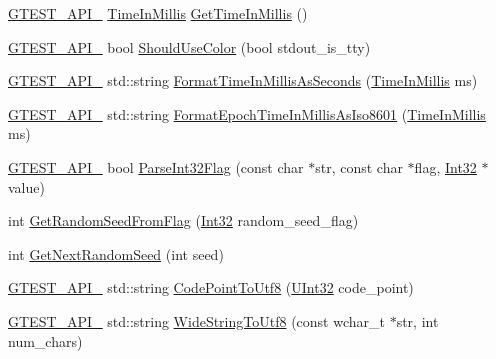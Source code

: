 \begin{DoxyCompactItemize}
\item 
\hyperlink{gtest-port_8h_aa73be6f0ba4a7456180a94904ce17790}{G\+T\+E\+S\+T\+\_\+\+A\+P\+I\+\_\+} \hyperlink{namespacetesting_1_1internal_a66a845df404b38fe85c5e14a069f255a}{Time\+In\+Millis} \hyperlink{namespacetesting_1_1internal_ae66b46943a429e6efb1db456d4cae90c}{Get\+Time\+In\+Millis} ()
\item 
\hyperlink{gtest-port_8h_aa73be6f0ba4a7456180a94904ce17790}{G\+T\+E\+S\+T\+\_\+\+A\+P\+I\+\_\+} bool \hyperlink{namespacetesting_1_1internal_ac1db1b4603967a6c4404f31cbbac31a6}{Should\+Use\+Color} (bool stdout\+\_\+is\+\_\+tty)
\item 
\hyperlink{gtest-port_8h_aa73be6f0ba4a7456180a94904ce17790}{G\+T\+E\+S\+T\+\_\+\+A\+P\+I\+\_\+} std\+::string \hyperlink{namespacetesting_1_1internal_a904485f27a54be8a5a92856e2d838797}{Format\+Time\+In\+Millis\+As\+Seconds} (\hyperlink{namespacetesting_1_1internal_a66a845df404b38fe85c5e14a069f255a}{Time\+In\+Millis} ms)
\item 
\hyperlink{gtest-port_8h_aa73be6f0ba4a7456180a94904ce17790}{G\+T\+E\+S\+T\+\_\+\+A\+P\+I\+\_\+} std\+::string \hyperlink{namespacetesting_1_1internal_a5ef227c4a610e7ff638b12dfb25b068e}{Format\+Epoch\+Time\+In\+Millis\+As\+Iso8601} (\hyperlink{namespacetesting_1_1internal_a66a845df404b38fe85c5e14a069f255a}{Time\+In\+Millis} ms)
\item 
\hyperlink{gtest-port_8h_aa73be6f0ba4a7456180a94904ce17790}{G\+T\+E\+S\+T\+\_\+\+A\+P\+I\+\_\+} bool \hyperlink{namespacetesting_1_1internal_ae3449e173767750b613114ceac6d916a}{Parse\+Int32\+Flag} (const char $\ast$str, const char $\ast$flag, \hyperlink{namespacetesting_1_1internal_a8ee38faaf875f133358abaf9bc056cec}{Int32} $\ast$value)
\item 
int \hyperlink{namespacetesting_1_1internal_ae74fedbdaebaac8d1202192266243b9e}{Get\+Random\+Seed\+From\+Flag} (\hyperlink{namespacetesting_1_1internal_a8ee38faaf875f133358abaf9bc056cec}{Int32} random\+\_\+seed\+\_\+flag)
\item 
int \hyperlink{namespacetesting_1_1internal_a6e07a655cb987d131cd8fbeba9a7f1eb}{Get\+Next\+Random\+Seed} (int seed)
\item 
\hyperlink{gtest-port_8h_aa73be6f0ba4a7456180a94904ce17790}{G\+T\+E\+S\+T\+\_\+\+A\+P\+I\+\_\+} std\+::string \hyperlink{namespacetesting_1_1internal_a0c0f9558efb9abb965851c4738cdc725}{Code\+Point\+To\+Utf8} (\hyperlink{namespacetesting_1_1internal_a40d4fffcd2bf56f18b1c380615aa85e3}{U\+Int32} code\+\_\+point)
\item 
\hyperlink{gtest-port_8h_aa73be6f0ba4a7456180a94904ce17790}{G\+T\+E\+S\+T\+\_\+\+A\+P\+I\+\_\+} std\+::string \hyperlink{namespacetesting_1_1internal_a05b8c86ff38243f34d8f839a0eadefb1}{Wide\+String\+To\+Utf8} (const wchar\+\_\+t $\ast$str, int num\+\_\+chars)

\end{DoxyCompactItemize}
